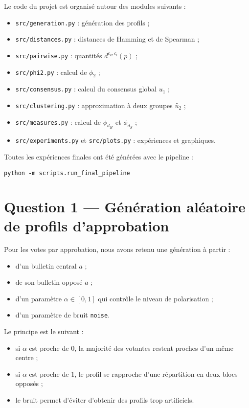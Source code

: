\documentclass[11pt,a4paper]{article}
\begin{document}
Le code du projet est organis\'e autour des modules suivants :
\begin{itemize}[leftmargin=*]
    \item \texttt{src/generation.py} : g\'en\'eration des profils ;
    \item \texttt{src/distances.py} : distances de Hamming et de Spearman ;
    \item \texttt{src/pairwise.py} : quantit\'es \(d^{c_k,c_l}(p)\) ;
    \item \texttt{src/phi2.py} : calcul de \(\phi_2\) ;
    \item \texttt{src/consensus.py} : calcul du consensus global \(u_1\) ;
    \item \texttt{src/clustering.py} : approximation \`a deux groupes \(\widetilde{u_2}\) ;
    \item \texttt{src/measures.py} : calcul de \(\phi_{d_H}\) et \(\phi_{d_S}\) ;
    \item \texttt{src/experiments.py} et \texttt{src/plots.py} : exp\'eriences et graphiques.
\end{itemize}

Toutes les exp\'eriences finales ont \'et\'e g\'en\'er\'ees avec le pipeline :
\begin{lstlisting}
python -m scripts.run_final_pipeline
\end{lstlisting}

\section{Question 1 --- G\'en\'eration al\'eatoire de profils d'approbation}

Pour les votes par approbation, nous avons retenu une g\'en\'eration \`a partir :
\begin{itemize}[leftmargin=*]
    \item d'un bulletin central \(a\) ;
    \item de son bulletin oppos\'e \(\overline{a}\) ;
    \item d'un param\`etre \(\alpha \in [0,1]\) qui contr\^ole le niveau de polarisation ;
    \item d'un param\`etre de bruit \texttt{noise}.
\end{itemize}

Le principe est le suivant :
\begin{itemize}[leftmargin=*]
    \item si \(\alpha\) est proche de \(0\), la majorit\'e des votantes restent proches d'un m\^eme centre ;
    \item si \(\alpha\) est proche de \(1\), le profil se rapproche d'une r\'epartition en deux blocs oppos\'es ;
    \item le bruit permet d'\'eviter d'obtenir des profils trop artificiels.
\end{itemize}
\end{document}
